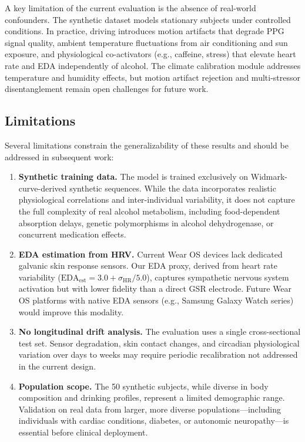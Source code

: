 \documentclass[HARVARD,Times2COL]{WileyNJDv5}
\begin{document}
A key limitation of the current evaluation is the absence of real-world confounders. The synthetic dataset models stationary subjects under controlled conditions. In practice, driving introduces motion artifacts that degrade PPG signal quality, ambient temperature fluctuations from air conditioning and sun exposure, and physiological co-activators (e.g., caffeine, stress) that elevate heart rate and EDA independently of alcohol. The climate calibration module addresses temperature and humidity effects, but motion artifact rejection and multi-stressor disentanglement remain open challenges for future work.

\subsection{Limitations}
Several limitations constrain the generalizability of these results and should be addressed in subsequent work:

\begin{enumerate}
\item \textbf{Synthetic training data.} The model is trained exclusively on Widmark-curve-derived synthetic sequences. While the data incorporates realistic physiological correlations and inter-individual variability, it does not capture the full complexity of real alcohol metabolism, including food-dependent absorption delays, genetic polymorphisms in alcohol dehydrogenase, or concurrent medication effects.

\item \textbf{EDA estimation from HRV.} Current Wear OS devices lack dedicated galvanic skin response sensors. Our EDA proxy, derived from heart rate variability ($\text{EDA}_{\text{est}} = 3.0 + \sigma_{\text{HR}} / 5.0$), captures sympathetic nervous system activation but with lower fidelity than a direct GSR electrode. Future Wear OS platforms with native EDA sensors (e.g., Samsung Galaxy Watch series) would improve this modality.

\item \textbf{No longitudinal drift analysis.} The evaluation uses a single cross-sectional test set. Sensor degradation, skin contact changes, and circadian physiological variation over days to weeks may require periodic recalibration not addressed in the current design.

\item \textbf{Population scope.} The 50 synthetic subjects, while diverse in body composition and drinking profiles, represent a limited demographic range. Validation on real data from larger, more diverse populations---including individuals with cardiac conditions, diabetes, or autonomic neuropathy---is essential before clinical deployment.
\end{enumerate}
\end{document}
